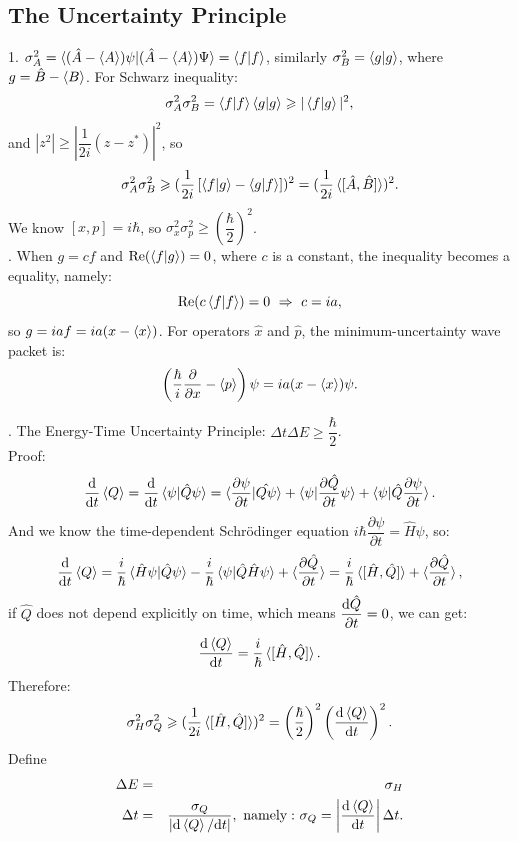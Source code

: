 \documentclass[12pt, 
]{article}
\begin{document}
\subsection{The Uncertainty Principle}
1. $\sigma_A^2=\braket{(\hat{A}-\braket{A})\psi|(\hat{A}-\braket{A})\Psi}=\braket{f|f}$, similarly $\sigma_B^2=\braket{g|g}$, where $g=\hat{B}-\braket{B}$. For Schwarz inequality:
\[
	\sigma_A^2\sigma_B^2=\braket{f|f}\braket{g|g}\geqslant|\braket{f|g}|^2,
\]
and $|z^2|\geqslant\left|\dfrac{1}{2i}(z-z^*)\right|^2$, so
\[
	\sigma^2_A\sigma^2_B\geqslant(\frac{1}{2i}\left[\braket{f|g}-\braket{g|f}\right])^2=(\frac{1}{2i}\braket{[\hat{A},\hat{B}]})^2.
\]
We know $[x,p]=i\hbar$, so $\sigma_x^2\sigma_p^2\geqslant\left(\dfrac{\hbar}{2}\right)^2$.
~\\

. When $g=cf$ and ${\rm Re}(\braket{f|g})=0$, where $c$ is a constant, the inequality becomes a equality, namely:
\[
	{\rm Re}(c\braket{f|f})=0~\Rightarrow~c=ia 
,\]
so $g=iaf=ia(x-\braket{x})$. For operators $\hat{x}$ and $\hat{p}$, the minimum-uncertainty wave packet is: $$\left(\frac{\hbar}{i}\frac{\partial}{\partial x}-\braket{p}\right)\psi=ia(x-\braket{x})\psi.$$

. The Energy-Time Uncertainty Principle: $\Delta t\Delta E\geqslant \dfrac{\hbar}{2}$.\\
Proof: \[
	\frac{{\rm d}}{{\rm d}t}\braket{Q}=\frac{{\rm d}}{{\rm d}t}\braket{\psi|\hat{Q}\psi}=\braket{\frac{\partial\psi}{\partial t}|\hat{Q\psi}}+\braket{\psi|\frac{\partial\hat{Q}}{\partial t}\psi}+\braket{\psi|\hat{Q}\frac{\partial\psi}{\partial t}}.
\]
And we know the time-dependent Schr\"odinger equation $i\hbar \dfrac{\partial \psi}{\partial t}=\hat{H}\psi$, so:
\[
	\frac{{\rm d}}{{\rm d}t}\braket{Q}=\frac{i}{\hbar}\braket{\hat{H}\psi|\hat{Q}\psi}-\frac{i}{\hbar}\braket{\psi|\hat{Q}\hat{H}\psi}+\braket{\frac{\partial\hat{Q}}{\partial t}}=\frac{i}{\hbar}\braket{[\hat{H},\hat{Q}]}+\braket{\frac{\partial\hat{Q}}{\partial t}}
,\]
if $\hat{Q}$ does not depend explicitly on time, which means $\dfrac{{\rm d}\hat{Q}}{\partial t}=0$, we can get:
\begin{equation}\label{eq:15}
	\frac{{\rm d}\braket{Q}}{{\rm d} t}=\frac{i}{\hbar}\braket{[\hat{H},\hat{Q}]}.
\end{equation}
Therefore:
\[
	\sigma_H^2\sigma_Q^2\geqslant(\frac{1}{2i}\braket{[\hat{H},\hat{Q}]})^2=\left(\frac{\hbar}{2}\right)^2\left(\frac{{\rm d}\braket{Q}}{{\rm d} t}\right)^2.
\]
Define
\begin{eqnarray*}
	\Delta E&=&\sigma_H\\
	\Delta t&=&\frac{\sigma_Q}{|{\rm d}\braket{Q}/{\rm d}t|}, ~{\rm namely:}~\sigma_Q=\left|\frac{{\rm d}\braket{Q}}{{\rm d}t}\right|\Delta t.
\end{eqnarray*}
~\\
\end{document}
